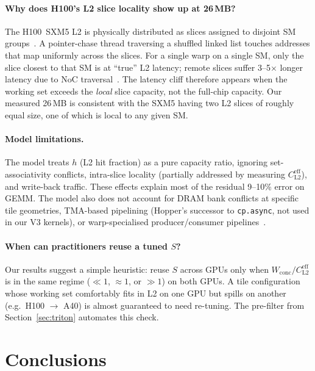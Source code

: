 \documentclass[10pt,twocolumn]{article}
\newcommand{\cpasync}{\texttt{cp.async}}
\newcommand{\wconc}{W_{\text{conc}}}
\newcommand{\cleff}{C_{\text{L2}}^{\text{eff}}}
\begin{document}
\paragraph{Why does H100's L2 slice locality show up at 26\,MB?}
The H100~SXM5 L2 is physically distributed as slices assigned to
disjoint SM groups~\cite{hopper_ieee}.  A pointer-chase thread
traversing a shuffled linked list touches addresses that map
uniformly across the slices.  For a single warp on a single SM,
only the slice closest to that SM is at ``true'' L2 latency; remote
slices suffer 3--5$\times$ longer latency due to NoC
traversal~\cite{gpu_noc}.  The latency cliff therefore appears when
the working set exceeds the \emph{local} slice capacity, not the
full-chip capacity.  Our measured 26\,MB is consistent with the
SXM5 having two L2 slices of roughly equal size, one of which is
local to any given SM.

\paragraph{Model limitations.}
The model treats $h$ (L2 hit fraction) as a pure capacity ratio,
ignoring set-associativity conflicts, intra-slice locality
(partially addressed by measuring $\cleff$), and write-back
traffic.  These effects explain most of the residual 9--10\% error
on GEMM.  The model also does not account for DRAM bank conflicts
at specific tile geometries, TMA-based pipelining (Hopper's
successor to \cpasync{}, not used in our V3 kernels), or
warp-specialised producer/consumer pipelines~\cite{tawa,wasp}.

\paragraph{When can practitioners reuse a tuned $S$?}
Our results suggest a simple heuristic: reuse $S$ across GPUs only
when $\wconc / \cleff$ is in the same regime ($\ll 1$, $\approx 1$,
or $\gg 1$) on both GPUs.  A tile configuration whose working set
comfortably fits in L2 on one GPU but spills on another (e.g.\
H100 $\to$ A40) is almost guaranteed to need re-tuning.  The
pre-filter from Section~\ref{sec:triton} automates this check.

\section{Conclusions}
\label{sec:conclusions}
\end{document}
